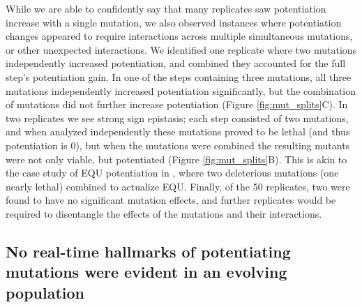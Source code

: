 While we are able to confidently say that many replicates saw potentiation increase with a single mutation, we also observed instances where potentiation changes appeared to require interactions across multiple simultaneous mutations, or other unexpected interactions. %
We identified one replicate where two mutations independently increased potentiation, and combined they accounted for the full step's potentiation gain. 
In one of the steps containing three mutations, all three mutations independently increased potentiation significantly, but the combination of mutations did not further increase potentiation (Figure \ref{fig:mut_splits}C). 
In two replicates we see strong sign epistasis; each step consisted of two mutations, and when analyzed independently these mutations proved to be lethal (and thus potentiation is 0), but when the mutations were combined the resulting mutants were not only viable, but potentiated (Figure \ref{fig:mut_splits}B). 
This is akin to the case study of EQU potentiation in \citep{covertiiiExperimentsRoleDeleterious2013}, where two deleterious mutations (one nearly lethal) combined to actualize EQU.
Finally, of the 50 replicates, two were found to have no significant mutation effects, and further replicates would be required to disentangle the effects of the mutations and their interactions.

\subsection{No real-time hallmarks of potentiating mutations were evident in an evolving population}

